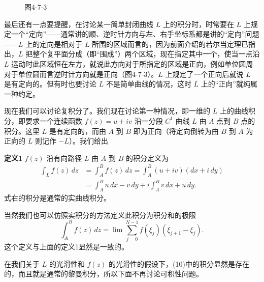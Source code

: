 \begin{figure}[htbp]
\centering
{}
\caption*{图4-7-3}
\end{figure}

最后还有一点要提醒，在讨论某一简单封闭曲线 $L$ 上的积分时，时常要在 $L$ 上规定一个“定向”——通常讲的顺、逆时针方向与左、右手坐标系都是讲的“定向”问题——$L$ 上的定向是相对于 $L$ 所围的区域而言的，因为前面介绍的若尔当定理已指出，$L$ 把整个复平面分成（即“围成”）两个区域，现在指定其中一个，使当一点沿 $L$ 运动时此区域恒在左方，就说此方向对于所指定的区域是正向，例如单位圆周对于单位圆而言逆时针方向就是正向（图4-7-3）。$L$ 上规定了一个正向后就说 $L$ 是有定向的。但有时也要讨论 $L$ 不是简单曲线的情况，这时 $L$ 上的“正向”就纯属一种约定。

现在我们可以讨论复积分了。我们现在讨论第一种情况，即一维的 $L$ 上的曲线积分，即要求一个连续函数 $f(z)=u+iv$ 沿一分段 $C^1$ 曲线 $L$ 由 $A$ 点到 $B$ 点的积分。这里 $L$ 是有定向的，而由 $A$ 到 $B$ 即为正向（将定向倒转为由 $B$ 到 $A$ 为正向的 $L$ 则记作 $-L$）。我们给出

\noindent\textbf{定义1}
$f(z)$ 沿有向路径 $L$ 由 $A$ 到 $B$ 的积分定义为
\begin{equation}
\begin{aligned}
 \int_L f(z)\,dz
 &=\int_A^B f(z)\,dz
 =\int_A^B(u+iv)(dx+i\,dy)\\
 &=\int_A^B u\,dx-v\,dy+i\int_A^B v\,dx+u\,dy.
\end{aligned}
\tag{10}
\end{equation}
式右的积分是通常的实曲线积分。

当然我们也可以仿照实积分的方法定义此积分为积分和的极限
\[
 \int_A^B f(z)\,dz
 =\lim\sum_{j=0}^{N-1}f(\xi_j)(\xi_{j+1}-\xi_j).
\]
这个定义与上面的定义1显然是一致的。

在我们关于 $L$ 的光滑性和 $f(z)$ 的光滑性的假设下，(10)中的积分显然是存在的，而且就是通常的黎曼积分，所以下面不再讨论可积性问题。

